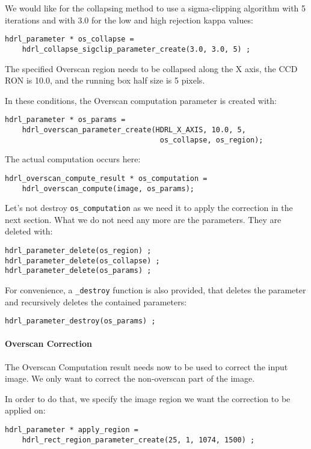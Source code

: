 We would like for the collapsing method to use a sigma-clipping algorithm 
with 5 iterations and with 3.0 for the low and high rejection kappa values:
\begin{lstlisting}
hdrl_parameter * os_collapse = 
    hdrl_collapse_sigclip_parameter_create(3.0, 3.0, 5) ;
\end{lstlisting}

The specified Overscan region needs to be collapsed along the X axis, the
CCD RON is 10.0, and the running box half size is 5 pixels.

In these conditions, the Overscan computation parameter is created with:
\begin{lstlisting}
hdrl_parameter * os_params = 
    hdrl_overscan_parameter_create(HDRL_X_AXIS, 10.0, 5, 
                                    os_collapse, os_region);
\end{lstlisting}

The actual computation occurs here:
\begin{lstlisting}
hdrl_overscan_compute_result * os_computation = 
    hdrl_overscan_compute(image, os_params);
\end{lstlisting}

Let's not destroy \verb+os_computation+ as we need it to apply the correction
in the next section. What we do not need any more are the parameters. They are
deleted with:
\begin{lstlisting}
hdrl_parameter_delete(os_region) ;
hdrl_parameter_delete(os_collapse) ;
hdrl_parameter_delete(os_params) ;
\end{lstlisting}

For convenience, a \verb+_destroy+ function is also provided, that
deletes the parameter and recursively deletes the contained parameters: 
\begin{lstlisting}
hdrl_parameter_destroy(os_params) ;
\end{lstlisting}

\paragraph{Overscan Correction} 

The Overscan Computation result needs now to be used to correct the input
image. We only want to correct the non-overscan part of the image.

In order to do that, we specify the image region we want the correction to 
be applied on:
\begin{lstlisting}
hdrl_parameter * apply_region = 
    hdrl_rect_region_parameter_create(25, 1, 1074, 1500) ;
\end{lstlisting}

